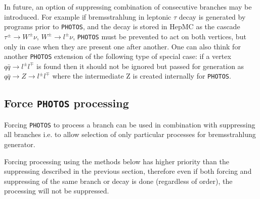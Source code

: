 \documentclass[]{Photos_interface_design}
\begin{document}
In future, an option of suppressing combination of consecutive branches may be introduced.
For example if bremsstrahlung in leptonic $\tau$ decay is generated by
programs prior to {\tt PHOTOS}, and the decay is stored in HepMC as the cascade
$\tau^\pm \to W^\pm \nu$, $W^\pm \to l^\pm \nu$, {\tt PHOTOS} must
be prevented to act on both vertices, but only in case when they are present one after another.
One can also think for another {\tt PHOTOS} extension of the following type of special case: if a vertex $q
\bar q \to l^\pm l^\mp$ is found then it should not be ignored but
passed for generation as $q \bar q \to Z \to l^\pm l^\mp$ where
the intermediate Z is created internally for {\tt PHOTOS}.

\subsection{Force {\tt PHOTOS} processing }
\label{section:force}

Forcing {\tt PHOTOS} to process a branch can be used in combination with
suppressing all branches i.e. to allow selection of only particular
processes for bremsstrahlung generator.

Forcing processing using the methods below has higher priority than the suppressing described
in the previous section, therefore even if both forcing and suppressing of the same
branch or decay is done (regardless of order), the processing will not be
suppressed.
\end{document}
